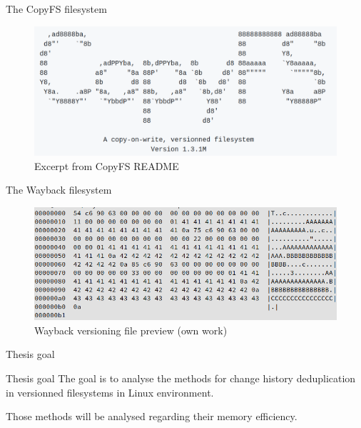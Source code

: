 \documentclass[xcolor=table]{beamer}
\begin{document}
	\begin{frame}{The CopyFS filesystem}
		\begin{figure}
			\centering

			\includegraphics[width=\textwidth]{media/copyfs.png}
			\caption{Excerpt from CopyFS README }
			\label{fig:copyfs}
		\end{figure}
		
	\end{frame}

	\begin{frame}{The Wayback filesystem}
		\begin{figure}
			\centering

			\includegraphics[width=\textwidth]{media/waybackfs-history.png}
			\caption{Wayback versioning file preview (own work)}
			\label{fig:wayback_versioning_history}
		\end{figure}
	\end{frame}

	\begin{frame}{Thesis goal}
		\begin{block}{Thesis goal}
			The goal is to analyse the methods for change history deduplication in 
			versionned filesystems in Linux environment. 

			Those methods will be analysed regarding their memory efficiency.
		\end{block}
	\end{frame}
\end{document}
